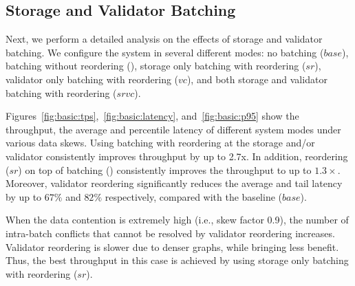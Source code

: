 \subsection{Storage and Validator Batching}
\label{subsec:experiment:batching}

Next, we perform a detailed analysis on the effects of storage and validator batching. We configure the system in several different modes: no batching ($base$), batching without reordering (), storage only batching with reordering ($sr$), validator only batching with reordering
($vc$), and both storage and validator batching with reordering ($srvc$).




Figures~\ref{fig:basic:tps},~\ref{fig:basic:latency}, and~\ref{fig:basic:p95} show the throughput, the average and percentile latency of different system modes under various data skews. Using batching with reordering at the storage and/or validator consistently improves throughput by up to 2.7x. In addition, reordering ($sr$) on top of batching () consistently improves the throughput to up to $1.3\times$. Moreover, validator reordering significantly reduces the average and tail latency by up to $67\%$ and $82\%$ respectively, compared with the baseline ($base$).

When the data contention is extremely high (i.e., skew factor 0.9), the number of intra-batch conflicts
that cannot be resolved by validator reordering increases. Validator reordering
is slower due to denser graphs, while bringing less benefit. Thus, the best throughput in this case is achieved by using storage only batching with reordering ($sr$). 

